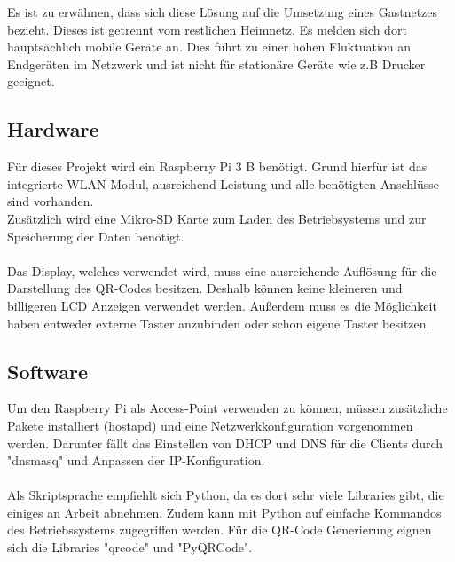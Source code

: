 \documentclass[a4paper,11pt,singlespacing]{article}
\begin{document}
    	Es ist zu erwähnen, dass sich diese Lösung auf die Umsetzung eines Gastnetzes bezieht. Dieses ist getrennt vom restlichen Heimnetz. Es melden sich dort hauptsächlich mobile Geräte an. Dies führt zu einer hohen Fluktuation an Endgeräten im Netzwerk und ist nicht für stationäre Geräte wie z.B Drucker geeignet.
    
    
    	\subsection{Hardware}
			Für dieses Projekt wird ein Raspberry Pi 3 B benötigt. Grund hierfür ist das integrierte WLAN-Modul, ausreichend Leistung und alle benötigten Anschlüsse sind vorhanden. \\
			Zusätzlich wird eine Mikro-SD Karte zum Laden des Betriebsystems und zur Speicherung der Daten benötigt. \\ \\
			Das Display, welches verwendet wird, muss eine ausreichende Auflösung für die Darstellung des QR-Codes besitzen. Deshalb können keine kleineren und billigeren LCD Anzeigen verwendet werden. Außerdem muss es die Möglichkeit haben entweder externe Taster anzubinden oder schon eigene Taster besitzen.
		
		\subsection{Software}
			Um den Raspberry Pi als Access-Point verwenden zu können, müssen zusätzliche Pakete installiert (hostapd) und eine Netzwerkkonfiguration vorgenommen werden. Darunter fällt das Einstellen von DHCP und DNS für die Clients durch "dnsmasq" und Anpassen der IP-Konfiguration. \\ \\
		
			Als Skriptsprache empfiehlt sich Python, da es dort sehr viele Libraries gibt, die einiges an Arbeit abnehmen. Zudem kann mit Python auf einfache Kommandos des Betriebssystems zugegriffen werden. Für die QR-Code Generierung eignen sich die Libraries "qrcode" und "PyQRCode". 
		
\end{document}
